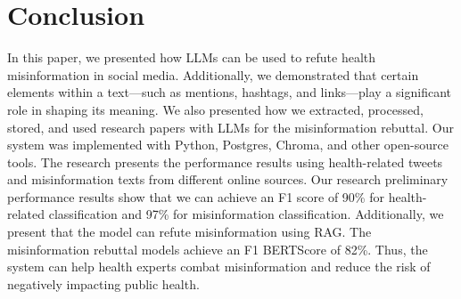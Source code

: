 \section{Conclusion}
In this paper, we presented how LLMs can be used to refute health misinformation in social media. Additionally, we demonstrated that certain elements within a text—such as mentions, hashtags, and links—play a significant role in shaping its meaning. We also presented how we extracted, processed, stored, and used research papers with LLMs for the misinformation rebuttal. Our system was implemented with Python, Postgres, Chroma, and other open-source tools. The research presents the performance results using health-related tweets and misinformation texts from different online sources. Our research preliminary performance results show that we can achieve an F1 score of 90\% for health-related classification and 97\% for misinformation classification. Additionally, we present that the model can refute misinformation using RAG. The misinformation rebuttal models achieve an F1 BERTScore of 82\%. Thus, the system can help health experts combat misinformation and reduce the risk of negatively impacting public health.

%
